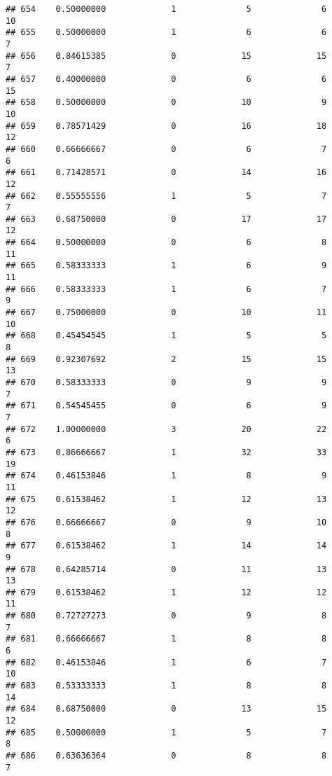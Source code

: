 \documentclass[
]{article}
\begin{document}
\begin{verbatim}
## 654    0.50000000             1              5              6             10
## 655    0.50000000             1              6              6              7
## 656    0.84615385             0             15             15              7
## 657    0.40000000             0              6              6             15
## 658    0.50000000             0             10              9             10
## 659    0.78571429             0             16             18             12
## 660    0.66666667             0              6              7              6
## 661    0.71428571             0             14             16             12
## 662    0.55555556             1              5              7              7
## 663    0.68750000             0             17             17             12
## 664    0.50000000             0              6              8             11
## 665    0.58333333             1              6              9             11
## 666    0.58333333             1              6              7              9
## 667    0.75000000             0             10             11             10
## 668    0.45454545             1              5              5              8
## 669    0.92307692             2             15             15             13
## 670    0.58333333             0              9              9              7
## 671    0.54545455             0              6              9              7
## 672    1.00000000             3             20             22              6
## 673    0.86666667             1             32             33             19
## 674    0.46153846             1              8              9             11
## 675    0.61538462             1             12             13             12
## 676    0.66666667             0              9             10              8
## 677    0.61538462             1             14             14              9
## 678    0.64285714             0             11             13             13
## 679    0.61538462             1             12             12             11
## 680    0.72727273             0              9              8              7
## 681    0.66666667             1              8              8              6
## 682    0.46153846             1              6              7             10
## 683    0.53333333             1              8              8             14
## 684    0.68750000             0             13             15             12
## 685    0.50000000             1              5              7              8
## 686    0.63636364             0              8              8              7

\end{verbatim}
\end{document}
